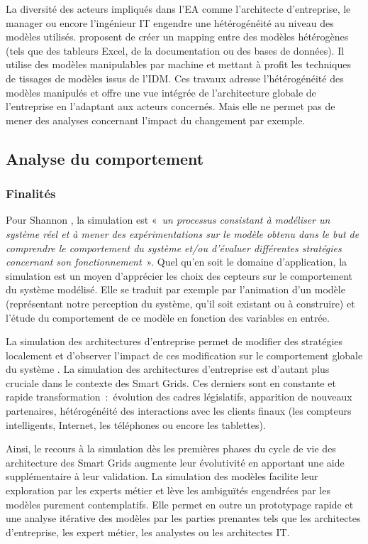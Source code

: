 	La diversité des acteurs impliqués dans l'EA comme l'architecte d'entreprise, le manager ou encore l'ingénieur IT engendre une hétérogénéité au niveau des modèles utilisés. \cite{bruneliere2013support} proposent de créer un mapping entre des modèles hétérogènes (tels que des tableurs Excel, de la documentation ou des bases de données). Il utilise des modèles manipulables par machine et mettant à profit les techniques de tissages de modèles issus de l'IDM. Ces travaux adresse l'hétérogénéité des modèles manipulés et offre une vue intégrée de l'architecture globale de l'entreprise en l'adaptant aux acteurs concernés. Mais elle ne permet pas de mener des analyses concernant l'impact du changement par exemple.   

	
	\subsection{Analyse du comportement}
	\subsubsection{Finalités}
	Pour Shannon \cite{shannon1975systems}, la simulation est 
«~\emph{un processus consistant à modéliser un système réel et à mener des expérimentations sur le modèle obtenu dans le but de comprendre le comportement du système et/ou d'évaluer différentes stratégies concernant son fonctionnement}~». 
Quel qu'en soit le domaine d'application, la simulation est un moyen d'apprécier les choix des cepteurs sur le comportement du système modélisé. Elle se traduit par exemple par l'animation d'un modèle (représentant notre perception du système, qu'il soit existant ou à construire) et l'étude du comportement de ce modèle en fonction des variables en entrée.  

La simulation des architectures d'entreprise permet de modifier des stratégies localement et d'observer l'impact de ces modification sur le comportement globale du système \cite{buckl2008towards}. La simulation des architectures d'entreprise est d'autant plus cruciale dans le contexte des Smart Grids. Ces derniers sont en constante et rapide transformation~:~évolution des cadres législatifs, apparition de nouveaux partenaires, hétérogénéité des interactions avec les clients finaux (les compteurs intelligents, Internet, les téléphones ou encore les tablettes). 

Ainsi, le recours à la simulation dès les premières phases du cycle de vie des architecture des Smart Grids augmente leur évolutivité en apportant une aide supplémentaire à leur validation. La simulation des modèles facilite leur exploration  par les experts métier et lève les ambiguïtés engendrées par les modèles purement contemplatifs. Elle permet en outre un prototypage rapide et une analyse itérative des modèles par les parties prenantes tels que les architectes d'entreprise, les expert métier, les analystes ou les architectes IT.

